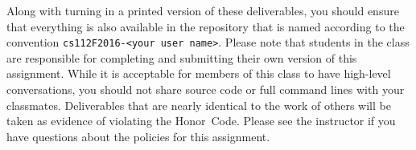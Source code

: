   Along with turning in a printed version of these deliverables, you should ensure that everything is also available in
  the repository that is named according to the convention {\tt cs112F2016-<your user name>}. Please note that students
  in the class are responsible for completing and submitting their own version of this assignment.    While it is
  acceptable for members of this class to have high-level conversations, you should not share source code or full
  command lines with your classmates.  Deliverables that are nearly identical to the work of others will be taken as
  evidence of violating the \mbox{Honor Code}.  Please see the instructor if you have questions about the policies for
  this assignment.

  
